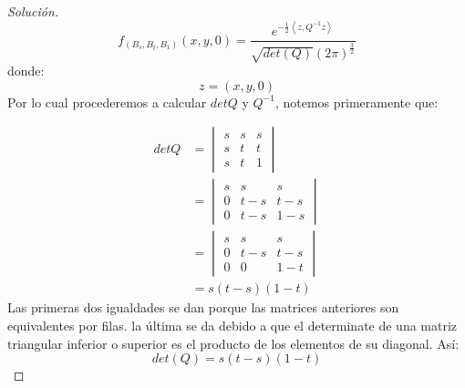 \documentclass[11pt,notitlepage]{article}
\newenvironment{solucion}
  {\begin{proof}[Solución]}
  {\end{proof}}
\begin{document}
\begin{solucion}
\begin{equation}\label{3.2}
    f_{(B_s,B_t,B_1)}(x,y,0) = \frac{e^{-\frac{1}{2}\left<z,Q^{-1}z \right>}}{\sqrt{det(Q)}(2\pi)^{\frac{3}{2}}}
\end{equation}
donde:
\[z = (x,y,0)\]
Por lo cual procederemos a calcular \(detQ\) y \(Q^{-1}\), notemos primeramente que: 

\begin{align*}
    detQ &= \begin{vmatrix}
s & s & s\\ 
s & t & t\\ 
s & t & 1
\end{vmatrix}  \\
         &=  \begin{vmatrix}
s & s & s\\ 
0 & t-s & t-s\\ 
0 & t-s & 1-s
\end{vmatrix} \\
         &= \begin{vmatrix}
s & s & s\\ 
0 & t-s & t-s\\ 
0 & 0 & 1-t
\end{vmatrix}\\
         &= s(t-s)(1-t) 
\end{align*}
Las primeras dos igualdades se dan porque las matrices anteriores son equivalentes por filas. la última se da debido a que el 
determinate de una matriz triangular inferior o superior es el producto de los elementos de su diagonal. Así: 
\begin{equation}\label{3.3}
    det(Q) =  s(t-s)(1-t) 
\end{equation}


\end{solucion}
\end{document}
